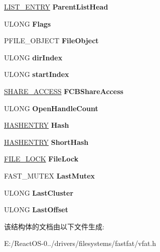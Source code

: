 \begin{DoxyCompactItemize}
\hyperlink{struct___l_i_s_t___e_n_t_r_y}{L\+I\+S\+T\+\_\+\+E\+N\+T\+RY} {\bfseries Parent\+List\+Head}
\item 
\mbox{\label{struct___v_f_a_t_f_c_b_a35d124316ebdc8e0e4365a855530f5d3}} 
U\+L\+O\+NG {\bfseries Flags}
\item 
\mbox{\label{struct___v_f_a_t_f_c_b_a0fd55cf61dc8d7bbd4427806d31ff251}} 
P\+F\+I\+L\+E\+\_\+\+O\+B\+J\+E\+CT {\bfseries File\+Object}
\item 
\mbox{\label{struct___v_f_a_t_f_c_b_a6f670a51c18f3090c41f8abd482809ab}} 
U\+L\+O\+NG {\bfseries dir\+Index}
\item 
\mbox{\label{struct___v_f_a_t_f_c_b_a8373107ea04ade3b3a1855fbc29f7d41}} 
U\+L\+O\+NG {\bfseries start\+Index}
\item 
\mbox{\label{struct___v_f_a_t_f_c_b_ade06cf7ae8082d09c360fbe3c1a61cde}} 
\hyperlink{struct___s_h_a_r_e___a_c_c_e_s_s}{S\+H\+A\+R\+E\+\_\+\+A\+C\+C\+E\+SS} {\bfseries F\+C\+B\+Share\+Access}
\item 
\mbox{\label{struct___v_f_a_t_f_c_b_ade29c627dedd412968796d43ed3f0ad5}} 
U\+L\+O\+NG {\bfseries Open\+Handle\+Count}
\item 
\mbox{\label{struct___v_f_a_t_f_c_b_ab58aead8dbdd44059e750cd99ab9e046}} 
\hyperlink{struct___h_a_s_h_e_n_t_r_y}{H\+A\+S\+H\+E\+N\+T\+RY} {\bfseries Hash}
\item 
\mbox{\label{struct___v_f_a_t_f_c_b_ac636288306fabc27b4327a00c9b1dabb}} 
\hyperlink{struct___h_a_s_h_e_n_t_r_y}{H\+A\+S\+H\+E\+N\+T\+RY} {\bfseries Short\+Hash}
\item 
\mbox{\label{struct___v_f_a_t_f_c_b_a0595aefd691376f3972ae7d5f60968a8}} 
\hyperlink{struct___f_i_l_e___l_o_c_k}{F\+I\+L\+E\+\_\+\+L\+O\+CK} {\bfseries File\+Lock}
\item 
\mbox{\label{struct___v_f_a_t_f_c_b_a6923cb769ae358760a83a724423d4c87}} 
F\+A\+S\+T\+\_\+\+M\+U\+T\+EX {\bfseries Last\+Mutex}
\item 
\mbox{\label{struct___v_f_a_t_f_c_b_af97f32f19f203b535b4f284b38eada35}} 
U\+L\+O\+NG {\bfseries Last\+Cluster}
\item 
\mbox{\label{struct___v_f_a_t_f_c_b_aa74e884e15a476c6372bc9766e780480}} 
U\+L\+O\+NG {\bfseries Last\+Offset}
\end{DoxyCompactItemize}


该结构体的文档由以下文件生成\+:\begin{DoxyCompactItemize}
\item 
E\+:/\+React\+O\+S-\/0../drivers/filesystems/fastfat/vfat.\+h\end{DoxyCompactItemize}
